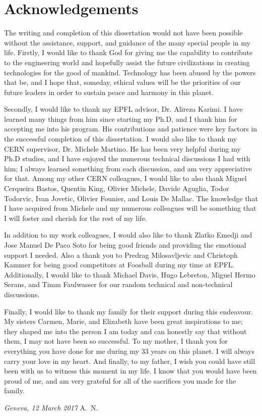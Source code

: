 \chapter*{Acknowledgements}

The writing and completion of this dissertation would not have been possible without the assistance, support, and guidance of the many special people in my life. Firstly, I would like to thank God for giving me the capability to contribute to the engineering world and hopefully assist the future civilizations in creating technologies for the good of mankind. Technology has been abused by the powers that be, and I hope that, someday, ethical values will be the priorities of our future leaders in order to sustain peace and harmony in this planet. 

Secondly, I would like to thank my EPFL advisor, Dr. Alireza Karimi. 
I have learned many things from him since starting my Ph.D, and I thank him for accepting me into his program. His contributions and patience were key factors in the successful completion of this dissertation.
I would also like to thank my CERN supervisor, Dr. Michele Martino. 
He has been very helpful during my Ph.D studies, and I have enjoyed the numerous technical discussions I had with him; I always learned something from each discussion, and am very appreciative for that. 
Among my other CERN colleagues, I would like to also thank Miguel Cerqueira Bastos, Quentin King, Olivier Michele, Davide Aguglia, Todor Todorvic, Ivan Jovetic, Olivier Founier, and Louis De Mallac. 
The knowledge that I have acquired from Michele and my numerous colleagues will be something that I will foster and cherish for the rest of my life.

In addition to my work colleagues, I would also like to thank Zlatko Emedji and Jose Manuel De Paco Soto for being good friends and providing the emotional support I needed. Also a thank you to Predrag Milosavljevic and Christoph Kammer for being good competitors at Foosball during my time at EPFL. Additionally, I would like to thank Michael Davis, Hugo Lebreton, Miguel Hermo Serans, and Timm Faulwasser for our random technical and non-technical discussions. 


Finally, I would like to thank my family for their support during this endeavour. 
My sisters Carmen, Marie, and Elizabeth have been great inspirations to me; they shaped me into the person I am today and can honestly say that without them, I may not have been so successful. 
To my mother, I thank you for everything you have done for me during my 33 years on this planet. 
I will always carry your love in my heart. 
And finally, to my father, I wish you could have still been with us to witness this moment in my life. 
I know that you would have been proud of me, and am very grateful for all of the sacrifices you made for the family.


\bigskip
 
\noindent\textit{Geneva, 12 March 2017}
\hfill A.~N.

